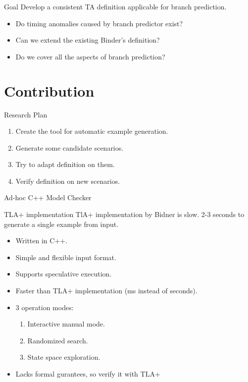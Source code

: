 \documentclass{beamer}
\begin{document}
\begin{frame}
    \begin{block}{Goal}
        Develop a consistent TA definition applicable for branch prediction.
    \end{block}

    \begin{itemize}
        \item Do timing anomalies caused by branch predictor exist?
        \item Can we extend the existing Binder's definition?
        \item Do we cover all the aspects of branch prediction?
    \end{itemize}

\end{frame}

\section{Contribution}

\begin{frame}{Research Plan}
    \begin{enumerate}
        \item Create the tool for automatic example generation.
        \item Generate some candidate scenarios.
        \item Try to adapt definition on them.
        \item Verify definition on new scenarios.
    \end{enumerate}
\end{frame}

\begin{frame}{Ad-hoc C++ Model Checker}
    \begin{alertblock}{TLA+ implementation}
        TlA+ implementation by Bidner is slow. 2-3 seconds to generate a single example from input.
    \end{alertblock}

    \begin{itemize}
        \item Written in C++.
        \item Simple and flexible input format.
        \item Supports speculative execution.
        \item Faster than TLA$+$ implementation (ms instead of seconds).
        \item 3 operation modes:
        \begin{enumerate}
            \item Interactive manual mode.
            \item Randomized search.
            \item State space exploration.
        \end{enumerate}
        \item Lacks formal gurantees, so verify it with TLA+
    \end{itemize}
\end{frame}
\end{document}
